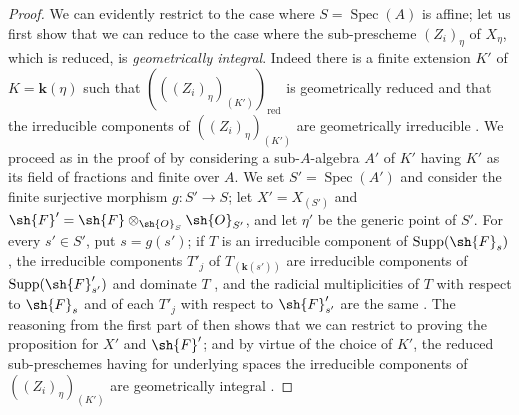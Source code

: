 \begin{proof}
\label{IV.9.8.6-proof}
We can evidently restrict to the case where $S=\operatorname{Spec}(A)$ is affine; let us first show that we can reduce to the case where the sub-prescheme $(Z_i)_\eta$ of $X_\eta$, which is reduced, is \emph{geometrically integral}.
Indeed there is a finite extension $K'$ of $K=\mathbf{k}(\eta)$ such that $(((Z_i)_\eta)_{(K')})_{\mathrm{red}}$ is geometrically reduced and that the irreducible components of $((Z_i)_\eta)_{(K')}$ are geometrically irreducible .
We proceed as in the proof of  by considering a sub-$A$-algebra $A'$ of $K'$ having $K'$ as its field of fractions and finite over $A$.
We set $S'=\operatorname{Spec}(A')$ and consider the finite surjective morphism $g:S'\to S$; let $X'=X_{(S')}$ and $\sh{F}'=\sh{F}\otimes_{\sh{O}_S}\sh{O}_{S'}$, and let $\eta'$ be the generic point of $S'$.
For every $s'\in S'$, put $s=g(s')$; if $T$ is an irreducible component of $\operatorname{Supp}(\sh{F}_s)$, the irreducible components $T'_j$ of $T_{(\mathbf{k}(s'))}$ are irreducible components of $\operatorname{Supp}(\sh{F}'_{s'})$ and dominate $T$ , and the radicial multiplicities of $T$ with respect to $\sh{F}_s$ and of each $T'_j$ with respect to $\sh{F}'_{s'}$ are the same .
The reasoning from the first part of  then shows that we can restrict to proving the proposition for $X'$ and $\sh{F}'$; and by virtue of the choice of $K'$, the reduced sub-preschemes having for underlying spaces the irreducible components of $((Z_i)_\eta)_{(K')}$ are geometrically integral .


\end{proof}
